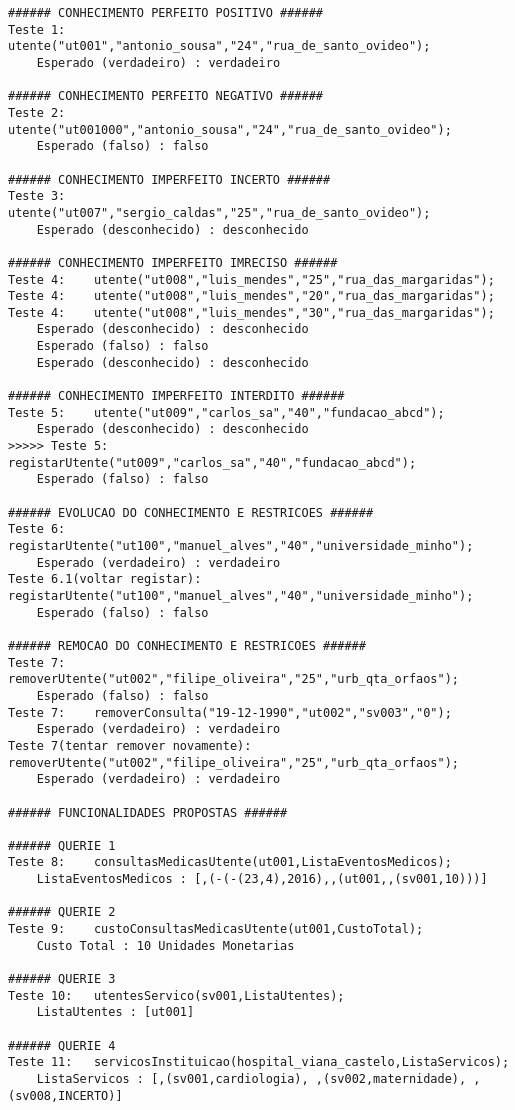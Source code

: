 \documentclass[
  oneside,
  10pt, a4paper,
  footinclude=true,
  headinclude=true,
  cleardoublepage=empty
]{scrbook}
\begin{document}
\begin{lstlisting}
###### CONHECIMENTO PERFEITO POSITIVO ######
Teste 1: 	utente("ut001","antonio_sousa","24","rua_de_santo_ovideo");
 	Esperado (verdadeiro) : verdadeiro

###### CONHECIMENTO PERFEITO NEGATIVO ######
Teste 2: 	utente("ut001000","antonio_sousa","24","rua_de_santo_ovideo");
 	Esperado (falso) : falso

###### CONHECIMENTO IMPERFEITO INCERTO ######
Teste 3: 	utente("ut007","sergio_caldas","25","rua_de_santo_ovideo");
 	Esperado (desconhecido) : desconhecido

###### CONHECIMENTO IMPERFEITO IMRECISO ######
Teste 4: 	utente("ut008","luis_mendes","25","rua_das_margaridas");
Teste 4: 	utente("ut008","luis_mendes","20","rua_das_margaridas");
Teste 4: 	utente("ut008","luis_mendes","30","rua_das_margaridas");
 	Esperado (desconhecido) : desconhecido
 	Esperado (falso) : falso
 	Esperado (desconhecido) : desconhecido

###### CONHECIMENTO IMPERFEITO INTERDITO ######
Teste 5: 	utente("ut009","carlos_sa","40","fundacao_abcd");
 	Esperado (desconhecido) : desconhecido
>>>>> Teste 5: 	registarUtente("ut009","carlos_sa","40","fundacao_abcd");
 	Esperado (falso) : falso

###### EVOLUCAO DO CONHECIMENTO E RESTRICOES ######
Teste 6: 	registarUtente("ut100","manuel_alves","40","universidade_minho");
 	Esperado (verdadeiro) : verdadeiro
Teste 6.1(voltar registar): 	registarUtente("ut100","manuel_alves","40","universidade_minho");
 	Esperado (falso) : falso

###### REMOCAO DO CONHECIMENTO E RESTRICOES ######
Teste 7: 	removerUtente("ut002","filipe_oliveira","25","urb_qta_orfaos");
 	Esperado (falso) : falso
Teste 7: 	removerConsulta("19-12-1990","ut002","sv003","0");
 	Esperado (verdadeiro) : verdadeiro
Teste 7(tentar remover novamente):  	removerUtente("ut002","filipe_oliveira","25","urb_qta_orfaos");
 	Esperado (verdadeiro) : verdadeiro

###### FUNCIONALIDADES PROPOSTAS ######

###### QUERIE 1
Teste 8: 	consultasMedicasUtente(ut001,ListaEventosMedicos);
 	ListaEventosMedicos : [,(-(-(23,4),2016),,(ut001,,(sv001,10)))]

###### QUERIE 2
Teste 9: 	custoConsultasMedicasUtente(ut001,CustoTotal);
 	Custo Total : 10 Unidades Monetarias

###### QUERIE 3
Teste 10: 	utentesServico(sv001,ListaUtentes);
 	ListaUtentes : [ut001]

###### QUERIE 4
Teste 11: 	servicosInstituicao(hospital_viana_castelo,ListaServicos);
 	ListaServicos : [,(sv001,cardiologia), ,(sv002,maternidade), ,(sv008,INCERTO)]
\end{lstlisting}
\end{document}
